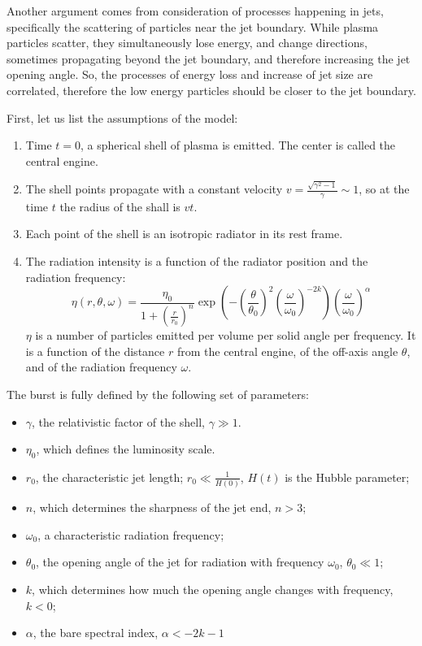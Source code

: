 \documentclass{article}
\begin{document}
Another argument comes from consideration of processes happening in
jets, specifically the scattering of particles near the jet boundary.
While plasma particles scatter, they simultaneously lose energy, and
change directions, sometimes propagating beyond the jet boundary, and
therefore increasing the jet opening angle.  So, the processes of
energy loss and increase of jet size are correlated, therefore the low
energy particles should be closer to the jet boundary.

First, let us list the assumptions of the model:

\begin{enumerate}
\item{Time $t = 0$, a spherical shell of plasma is emitted. The center
  is called the central engine.}
\item{The shell points propagate with a constant velocity $v =
  \frac{\sqrt{\gamma^2 - 1}}{\gamma} \sim 1$, so at the time $t$ the
  radius of the shall is $v t$.}
\item{Each point of the shell is an isotropic radiator in its rest
  frame.}
\item{ The radiation intensity is a function of the radiator position
  and the radiation frequency:
	\begin{equation}\label{eq:eta}
		\eta\left(r,\theta,\omega\right) = 
		\frac{\eta_0}{1 + \left(\frac{r}{r_0}\right)^n}
		\exp\left(
			-\left(\frac{\theta}{\theta_0}\right)^2
			\left(\frac{\omega}{\omega_0}\right)^{-2k}
		\right)
		\left(\frac{\omega}{\omega_0}\right)^\alpha
	\end{equation}
	$\eta$ is a number of particles emitted per volume per solid
        angle per frequency. It is a function of the distance $r$ from
        the central engine, of the off-axis angle $\theta$, and of the
        radiation frequency $\omega$.  }
\end{enumerate}

The burst is fully defined by the following set of parameters:
\begin{itemize}
\item{$\gamma$, the relativistic factor of the shell, $\gamma \gg 1$.}
\item{$\eta_0$, which defines the luminosity scale.}
\item{$r_0$, the characteristic jet length; $r_0 \ll \frac{1}{H\left(0\right)}$, $H\left(t\right)$ is the Hubble parameter;}
\item{$n$, which determines the sharpness of the jet end, $n > 3$;}
\item{$\omega_0$, a characteristic radiation frequency;}
\item{$\theta_0$, the opening angle of the jet for radiation with frequency $\omega_0$, $\theta_0 \ll 1$;}
\item{$k$, which determines how much the opening angle changes with frequency, $k < 0$;}
\item{$\alpha$, the bare spectral index, $\alpha < -2k - 1$}
\end{itemize}
\end{document}
